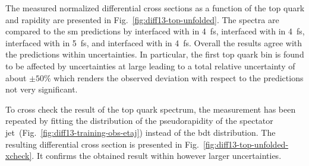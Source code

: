 The measured normalized differential cross sections as a function of the top quark \pt and rapidity are presented in Fig.~\ref{fig:diff13-top-unfolded}. The spectra are compared to the \gls{sm} predictions by \MGAMC interfaced with \PYTHIA in 4~\gls{fs}, \POWHEG interfaced with \PYTHIA in 4~\gls{fs}, \MGAMC interfaced with \PYTHIA in 5~\gls{fs}, and \MGAMC interfaced with \HERWIG in 4~\gls{fs}. Overall the results agree with the predictions within uncertainties. In particular, the first top quark \pt bin is found to be affected by uncertainties at large leading to a total relative uncertainty of about $\pm50\%$ which renders the observed deviation with respect to the predictions not very significant.


To cross check the result of the top quark \pt spectrum, the measurement has been repeated by fitting the distribution of the pseudorapidity of the spectator jet~(Fig.~\ref{fig:diff13-training-obs-etaj}) instead of the \gls{bdt} distribution. The resulting differential cross section is presented in Fig.~\ref{fig:diff13-top-unfolded-xcheck}. It confirms the obtained result within however larger uncertainties.

